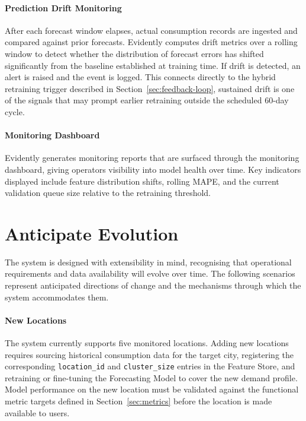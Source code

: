 \documentclass[12pt, a4paper]{report}
\begin{document}
\paragraph{Prediction Drift Monitoring}
After each forecast window elapses, actual consumption records are ingested and compared against prior forecasts. Evidently computes drift metrics over a rolling window to detect whether the distribution of forecast errors has shifted significantly from the baseline established at training time. If drift is detected, an alert is raised and the event is logged. This connects directly to the hybrid retraining trigger described in Section~\ref{sec:feedback-loop}, sustained drift is one of the signals that may prompt earlier retraining outside the scheduled 60-day cycle.

\paragraph{Monitoring Dashboard}
Evidently generates monitoring reports that are surfaced through the monitoring dashboard, giving operators visibility into model health over time. Key indicators displayed include feature distribution shifts, rolling MAPE, and the current validation queue size relative to the retraining threshold.

\section{Anticipate Evolution}

The system is designed with extensibility in mind, recognising that operational requirements and data availability will evolve over time. The following scenarios represent anticipated directions of change and the mechanisms through which the system accommodates them.

\paragraph{New Locations}
The system currently supports five monitored locations. Adding new locations requires sourcing historical consumption data for the target city, registering the corresponding \texttt{location\_id} and \texttt{cluster\_size} entries in the Feature Store, and retraining or fine-tuning the Forecasting Model to cover the new demand profile. 
Model performance on the new location must be validated against the functional metric targets defined in Section~\ref{sec:metrics} before the location is made available to users.
\end{document}
